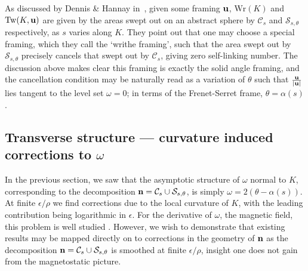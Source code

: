     As discussed by Dennis \& Hannay in~\citep{Dennis2005}, given some framing ${\bf u}$, $\mathrm{Wr}(K)$ and $\mathrm{Tw}(K, {\bf u})$ are given by the areas swept out on an abstract sphere by $\mathcal{C}_s$ and $\mathcal{S}_{s,\theta}$ respectively, as $s$ varies along $K$. They point out that one may choose a special framing, which they call the `writhe framing', such that the area swept out by $\mathcal{S}_{s,\theta}$ precisely cancels that swept out by $\mathcal{C}_s$, giving zero self-linking number. The discussion above makes clear this framing is exactly the solid angle framing, and the cancellation condition may be naturally read as a variation of $\theta$ such that $\frac{{\bf u}}{|{\bf u}|}$ lies tangent to the level set $\omega = 0$; in terms of the Frenet-Serret frame, $\theta= \alpha(s)$.

    \subsection{Transverse structure --- curvature induced corrections to $\omega$}

    In the previous section, we saw that the asymptotic structure of $\omega$ normal to $K$, corresponding to the decomposition ${\bf n} = \mathcal{C}_s \cup \mathcal{S}_{s,\theta}$, is simply $\omega = 2( \theta - \alpha(s))$. At finite $\epsilon/\rho$ we find corrections due to the local curvature of $K$, with the leading contribution being logarithmic in $\epsilon$. For the derivative of $\omega$, the magnetic field, this problem is well studied \citep{Saffman1992,Ricca1994}. However, we wish to demonstrate that existing results may be mapped directly on to corrections in the geometry of $\bf n$ as the decomposition ${\bf n} = \mathcal{C}_s \cup \mathcal{S}_{s,\theta}$ is smoothed at finite $\epsilon/\rho$, insight one does not gain from the magnetostatic picture.

